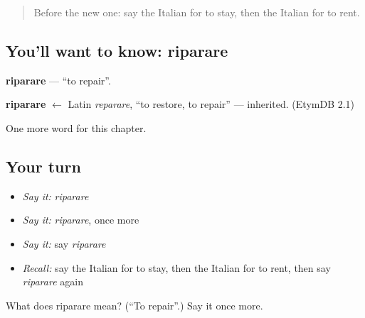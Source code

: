 \label{lesson:IT-C135-riparare}



\begin{quote}
Before the new one: say the Italian for to stay, then the Italian for to rent.
\end{quote}

\subsection*{You'll want to know: riparare}
\textbf{riparare} — \textquotedblleft{}to repair\textquotedblright{}.

\begin{cousinweb}
\textbf{riparare} $\leftarrow$ Latin \emph{reparare}, \textquotedblleft{}to restore, to repair\textquotedblright{} — inherited. (EtymDB 2.1)
\end{cousinweb}

\begin{grammarlens}[title={What you've built}]
One more word for this chapter.
\end{grammarlens}

\subsection*{Your turn}
\begin{itemize}
\raggedright
  \item \emph{Say it:} \emph{riparare}
  \item \emph{Say it:} \emph{riparare}, once more
  \item \emph{Say it:} say \emph{riparare}
  \item \emph{Recall:} say the Italian for to stay, then the Italian for to rent, then say \emph{riparare} again
\end{itemize}

\begin{tcolorbox}[breakable,colback=teal!4,colframe=teal!35!black,title={Before you move on}]
What does riparare mean? (\textquotedblleft{}To repair\textquotedblright{}.) Say it once more.
\end{tcolorbox}
